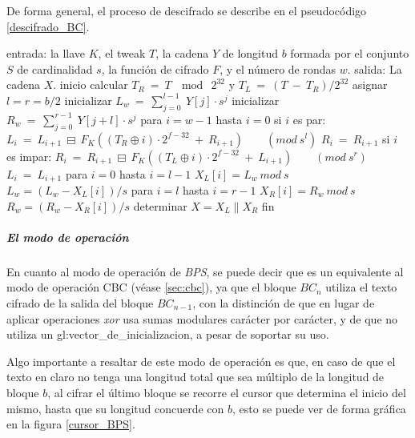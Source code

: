 De forma general, el proceso de descifrado se describe en el pseudocódigo 
\ref{descifrado_BC}.

\begin{pseudocodigo}[caption={Proceso de descifrado $BC^{-1}$.}, 
label={descifrado_BC}]
  entrada:    la llave $K$, el tweak $T$, la cadena $Y$ de longitud $b$ formada por el conjunto $S$ 
              de cardinalidad $s$, la función de cifrado $F$, y el número de rondas $w$. 
  salida:     La cadena $X$.
  inicio
    calcular $T_R\: =\: T\: \mod\: 2^{32}$ y $T_L\: =\: (T\: -\: T_R) / 2^{32}$
    asignar $l = r = b/2$
    inicializar $L_w\: =\: \sum_{j=0}^{l-1}\: Y[j] \cdot s^j$
    inicializar $R_w\: =\: \sum_{j=0}^{r-1}\: Y[j+l] \cdot s^j$
    para $i=w-1$ hasta $i=0$
    si $i$ es par:
      $L_i\: =\: L_{i+1}\: \boxminus\: F_K((T_R \oplus i) \cdot 2^{f-32}\: +\: R_{i+1})\qquad (mod\ s^l)$
      $R_i\: =\: R_{i+1}$
    si $i$ es impar:
      $R_i\: =\: R_{i+1}\: \boxminus\: F_K((T_L \oplus i) \cdot 2^{f-32}\: +\: L_{i+1})\qquad (mod\ s^r)$
      $L_i\: =\: L_{i+1}$
    para $i=0$ hasta $i=l-1$
      $X_L[i] = L_w\ mod\ s$
      $L_w = (L_w - X_L[i])/s$
    para $i=l$ hasta $i=r-1$
      $X_R[i] = R_w\ mod\ s$
      $R_w = (R_w - X_R[i])/s$
    determinar $X = X_L \parallel X_R$
  fin
\end{pseudocodigo}


\subparagraph{El modo de operación}

En cuanto al modo de operación de \textit{BPS}, se puede decir que es un 
equivalente al modo de operación CBC (véase \ref{sec:cbc}), ya que el bloque 
$BC_n$ utiliza el texto cifrado de la salida del bloque $BC_{n-1}$, con la 
distinción de que en lugar de aplicar operaciones \textit{xor} usa sumas 
modulares carácter por carácter, y de que no utiliza un 
\gls{gl:vector_de_inicializacion}, a pesar de soportar su uso.

Algo importante a resaltar de este modo de operación es que, en caso de que el 
texto en claro no tenga una longitud total que sea múltiplo de la longitud de 
bloque $b$, al cifrar el último bloque se recorre el cursor que determina 
el inicio del mismo, hasta que su longitud concuerde con $b$, esto se puede 
ver de forma gráfica en la figura \ref{cursor_BPS}.

